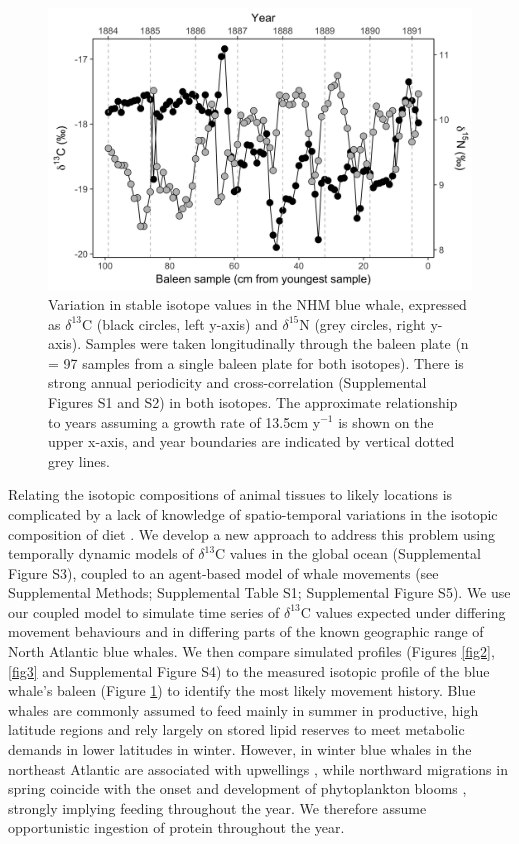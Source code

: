 \documentclass[a4paper,12pt]{article}
\begin{document}
\begin{figure}
  \centering
  \includegraphics[width = \linewidth]{figures/Figure-1-raw-dC-dN-data.png}
  \caption{Variation in stable isotope values in the NHM blue whale, expressed as $\delta^{13}$C (black circles, left y-axis) and $\delta^{15}$N (grey circles, right y-axis). Samples were taken longitudinally through the baleen plate (n = 97 samples from a single baleen plate for both isotopes). There is strong annual periodicity and cross-correlation (Supplemental Figures S1 and S2) in both isotopes. The approximate relationship to years assuming a growth rate of 13.5cm y$^{-1}$ is shown on the upper x-axis, and year boundaries are indicated by vertical dotted grey lines.}
  \label{fig1}
\end{figure}

Relating the isotopic compositions of animal tissues to likely locations is complicated by a lack of knowledge of spatio-temporal variations in the isotopic composition of diet \cite{west2006stable,mcmahon2015millennial}.
We develop a new approach to address this problem using temporally dynamic models of $\delta^{13}$C values in the global ocean \cite{magozzi2017using} (Supplemental Figure S3), coupled to an agent-based model of whale movements (see Supplemental Methods; Supplemental Table S1; Supplemental Figure S5).  
We use our coupled model to simulate time series of $\delta^{13}$C values expected under differing movement behaviours and in differing parts of the known geographic range of North Atlantic blue whales. 
We then compare simulated profiles (Figures \ref{fig2}, \ref{fig3} and Supplemental Figure S4) to the measured isotopic profile of the blue whale's baleen (Figure \ref{fig1}) to identify the most likely movement history. 
Blue whales are commonly assumed to feed mainly in summer in productive, high latitude regions and rely largely on stored lipid reserves to meet metabolic demands in lower latitudes in winter. 
However, in winter blue whales in the northeast Atlantic are associated with upwellings \cite{baines2017autumn}, while northward migrations in spring coincide with the onset and development of phytoplankton blooms \cite{silva2013north,visser2011timing,busquets2017estimating}, strongly implying feeding throughout the year. 
We therefore assume opportunistic ingestion of protein throughout the year. 
\end{document}
